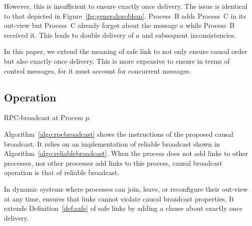 
However, this is insufficient to ensure exactly once delivery. The issue is
identical to that depicted in Figure~\ref{fig:generalproblem}. Process~B adds
Process~C in its out-view but Process~C already forgot about the message $a$
while Process~B received it. This leads to double delivery of $a$ and subsequent
inconsistencies.

In this paper, we extend the meaning of safe link to not only ensure causal
order but also exactly once delivery. This is more expensive to ensure in terms
of control messages, for it must account for concurrent messages.  



\subsection{Operation}

\begin{algorithm}[h]
  
  \caption{\label{algo:rpcbroadcast}RPC-broadcast at Process $p$.}
\end{algorithm}

Algorithm~\ref{algo:rpcbroadcast} shows the instructions of the proposed causal
broadcast. It relies on an implementation of reliable broadcast shown in
Algorithm~\ref{algo:reliablebroadcast}. When the process does not add links to
other processes, nor other processes add links to this process, causal broadcast
operation is that of reliable broadcast. 

In dynamic systems where processes can join, leave, or reconfigure their
out-view at any time, \RPCBROADCAST ensures that links cannot violate causal
broadcast properties. It extends Definition~\ref{def:safe} of safe links by
adding a clause about exactly once delivery. 


